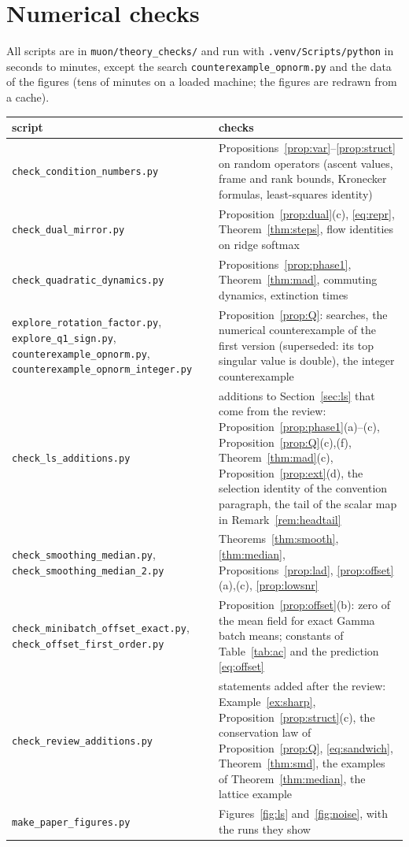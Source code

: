 \documentclass[11pt]{article}
\theoremstyle{definition}
\theoremstyle{remark}
\begin{document}
\section{Numerical checks}\label{app:checks}
All scripts are in \texttt{muon/theory\_checks/} and run with \texttt{.venv/Scripts/python} in seconds to minutes,
except the search \texttt{counterexample\_opnorm.py} and the data of the figures (tens of minutes on a loaded machine;
the figures are redrawn from a cache).
\begin{center}\small
\begin{tabular}{@{}p{6.3cm}p{9.3cm}@{}}
\toprule
script & checks\\
\midrule
\texttt{check\_condition\_numbers.py} & Propositions~\ref{prop:var}--\ref{prop:struct} on random operators (ascent values, frame and rank bounds, Kronecker formulas, least-squares identity)\\
\texttt{check\_dual\_mirror.py} & Proposition~\ref{prop:dual}(c), \eqref{eq:repr}, Theorem~\ref{thm:steps}, flow identities on ridge softmax\\
\texttt{check\_quadratic\_dynamics.py} & Propositions~\ref{prop:phase1}, Theorem~\ref{thm:mad}, commuting dynamics, extinction times\\
\texttt{explore\_rotation\_factor.py}, \texttt{explore\_q1\_sign.py}, \texttt{counterexample\_opnorm.py}, \texttt{counterexample\_opnorm\_integer.py} & Proposition~\ref{prop:Q}: searches, the numerical counterexample of the first version (superseded: its top singular value is double), the integer counterexample\\
\texttt{check\_ls\_additions.py} & additions to Section~\ref{sec:ls} that come from the review: Proposition~\ref{prop:phase1}(a)--(c), Proposition~\ref{prop:Q}(c),(f), Theorem~\ref{thm:mad}(c), Proposition~\ref{prop:ext}(d), the selection identity of the convention paragraph, the tail of the scalar map in Remark~\ref{rem:headtail}\\
\texttt{check\_smoothing\_median.py}, \texttt{check\_smoothing\_median\_2.py} & Theorems~\ref{thm:smooth}, \ref{thm:median}, Propositions~\ref{prop:lad}, \ref{prop:offset}(a),(c), \ref{prop:lowsnr}\\
\texttt{check\_minibatch\_offset\_exact.py}, \texttt{check\_offset\_first\_order.py} & Proposition~\ref{prop:offset}(b): zero of the mean field for exact Gamma batch means; constants of Table~\ref{tab:ac} and the prediction \eqref{eq:offset}\\
\texttt{check\_review\_additions.py} & statements added after the review: Example~\ref{ex:sharp}, Proposition~\ref{prop:struct}(c), the conservation law of Proposition~\ref{prop:Q}, \eqref{eq:sandwich}, Theorem~\ref{thm:smd}, the examples of Theorem~\ref{thm:median}, the lattice example\\
\texttt{make\_paper\_figures.py} & Figures~\ref{fig:ls} and~\ref{fig:noise}, with the runs they show\\
\bottomrule
\end{tabular}
\end{center}
\end{document}
